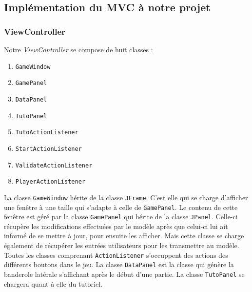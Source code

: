 	\subsection{Implémentation du MVC à notre projet}
		\subsubsection{ViewController}
		Notre \textit{ViewController} se compose de huit classes : 
		\begin{multicols}{2}
        \begin{enumerate}
            \item \texttt{GameWindow}
            \item \texttt{GamePanel}
            \item \texttt{DataPanel}
            \item \texttt{TutoPanel}
            \item \texttt{TutoActionListener}
            \item \texttt{StartActionListener}
            \item \texttt{ValidateActionListener}
            \item \texttt{PlayerActionListener}
            
        \end{enumerate}
	    \end{multicols}
	    La classe \texttt{GameWindow} hérite de la classe \texttt{JFrame}. C'est elle 
	    qui se charge d'afficher une fenêtre à une taille qui s'adapte à celle de \texttt{GamePanel}. Le contenu
	    de cette fenêtre est géré par la classe \texttt{GamePanel} qui hérite de la 
	    classe \texttt{JPanel}. Celle-ci récupère les modifications effectuées par le 
	    modèle après que celui-ci lui ait informé de se mettre à jour, pour ensuite 
	    les afficher. Mais cette classe se charge également de récupérer les entrées 
	    utilisateurs pour les transmettre au modèle. Toutes les classes comprenant \texttt{ActionListener} s'occuppent des actions des différents boutons dans le jeu. La classe \texttt{DataPanel} est la classe qui génère la banderole latérale s'affichant après le début d'une partie. La classe \texttt{TutoPanel} se chargera quant à elle du tutoriel.
	    
